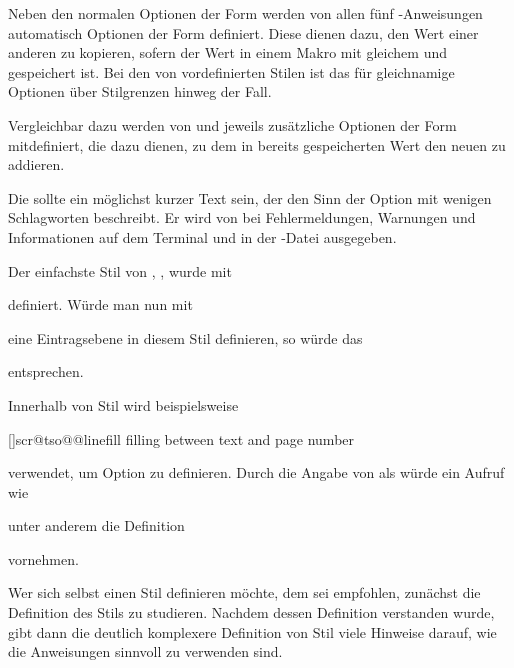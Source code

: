 Neben den normalen Optionen der Form
 werden von allen fünf
-Anweisungen automatisch Optionen der Form
 definiert. Diese dienen
dazu, den Wert einer anderen  zu kopieren, sofern der
Wert in einem Makro mit gleichem  und 
gespeichert ist. Bei den von  vordefinierten Stilen ist das
für gleichnamige Optionen über Stilgrenzen hinweg der Fall.

Vergleichbar dazu werden von  und
 jeweils zusätzliche Optionen der Form
 mitdefiniert, die dazu dienen, zu
dem in  bereits
gespeicherten Wert den neuen  zu addieren.

Die  sollte ein möglichst kurzer Text sein, der den Sinn der
Option mit wenigen Schlagworten beschreibt. Er wird von  bei
Fehlermeldungen, Warnungen und Informationen auf dem Terminal und in der
-Datei ausgegeben.
\begin{Example}
Der einfachste Stil von , , wurde mit
\begin{lstcode}
\end{lstcode}
definiert. Würde man nun mit
\begin{lstcode}
\end{lstcode}
eine Eintragsebene  in diesem Stil definieren, so würde das%
\iffalse unter anderem\fi%
\begin{lstcode}
  \def\dummytocdepth{1}
  \def\l@dummy#1#2{}
\end{lstcode}
entsprechen.

Innerhalb von Stil  wird beispielsweise
\begin{lstcode}
    [\TOCLineLeaderFill]{scr@tso@}{@linefill}%
    {filling between text and page number}%
\end{lstcode}
verwendet, um Option  zu definieren. Durch die Angabe von
 als  würde ein
Aufruf wie
\begin{lstcode}
\end{lstcode}
unter anderem die Definition
\begin{lstcode}
  \def\scr@tso@part@linefill{\TOCLineLeaderFill}
\end{lstcode}
vornehmen.
\end{Example}
Wer sich selbst einen Stil definieren möchte, dem sei
empfohlen, zunächst die Definition des Stils  zu
studieren. Nachdem dessen Definition verstanden wurde, gibt dann die deutlich
komplexere Definition von Stil  viele Hinweise darauf, wie die
Anweisungen sinnvoll zu verwenden sind.

